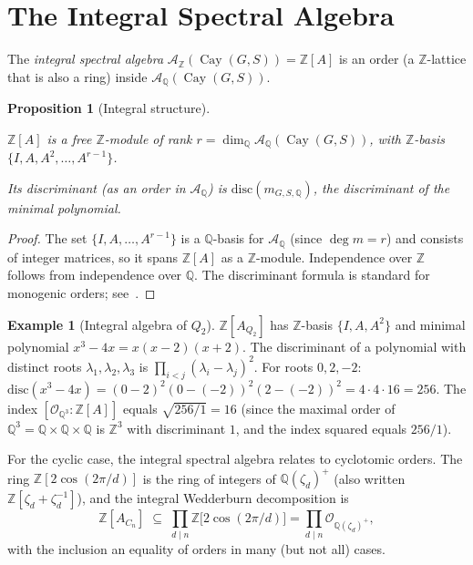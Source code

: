 \documentclass[12pt]{amsart}
\numberwithin{equation}{section}
\theoremstyle{plain}
\newtheorem{proposition}[theorem]{Proposition}
\theoremstyle{definition}
\newtheorem{example}[theorem]{Example}
\DeclareMathOperator{\Cay}{Cay}
\newcommand{\Z}{\mathbb{Z}}
\newcommand{\Q}{\mathbb{Q}}
\newcommand{\calA}{\mathcal{A}}
\begin{document}
\section{The Integral Spectral Algebra}
\label{sec:integral}

The \emph{integral spectral algebra} $\mathcal{A}_\Z(\Cay(G,S)) = \Z[A]$
is an order (a $\Z$-lattice that is also a ring) inside
$\calA_\Q(\Cay(G,S))$.

\begin{proposition}[Integral structure]
\label{prop:integral}
\begin{sloppypar}
$\Z[A]$ is a free $\Z$-module
of rank $r = \dim_\Q \calA_\Q(\Cay(G,S))$,
with $\Z$-basis $\{I, A, A^2, \ldots, A^{r-1}\}$.
\end{sloppypar}
Its discriminant
(as an order in $\calA_\Q$) is $\mathrm{disc}(m_{G,S,\Q})$, the
discriminant of the minimal polynomial.
\end{proposition}

\begin{proof}
The set $\{I, A, \ldots, A^{r-1}\}$ is a $\Q$-basis for $\calA_\Q$
(since $\deg m = r$) and consists of integer matrices, so it spans
$\Z[A]$ as a $\Z$-module.  Independence over $\Z$ follows from
independence over $\Q$.  The discriminant formula is standard for
monogenic orders; see~\cite{Neu99}.
\end{proof}

\begin{example}[Integral algebra of $Q_2$]
$\Z[A_{Q_2}]$ has $\Z$-basis $\{I, A, A^2\}$ and minimal polynomial
$x^3 - 4x = x(x-2)(x+2)$.  The discriminant of a polynomial with
distinct roots $\lambda_1, \lambda_2, \lambda_3$ is
$\prod_{i < j}(\lambda_i - \lambda_j)^2$.  For roots $0, 2, -2$:
$\mathrm{disc}(x^3-4x) = (0-2)^2(0-(-2))^2(2-(-2))^2
= 4 \cdot 4 \cdot 16 = 256$.
The index $[\mathcal{O}_{\Q^3} : \Z[A]]$ equals $\sqrt{256/1} = 16$
(since the maximal order of $\Q^3 = \Q \times \Q \times \Q$ is $\Z^3$
with discriminant $1$, and the index squared equals $256/1$).
\end{example}

For the cyclic case, the integral spectral algebra relates to cyclotomic
orders.  The ring $\Z[2\cos(2\pi/d)]$ is the ring of integers of
$\Q(\zeta_d)^+$ (also written $\Z[\zeta_d + \zeta_d^{-1}]$), and the
integral Wedderburn decomposition is
\[
  \Z[A_{C_n}] \;\subseteq\; \prod_{d \mid n} \Z\bigl[2\cos(2\pi/d)\bigr]
  = \prod_{d \mid n} \mathcal{O}_{\Q(\zeta_d)^+},
\]
with the inclusion an equality of orders in many (but not all) cases.
\end{document}
